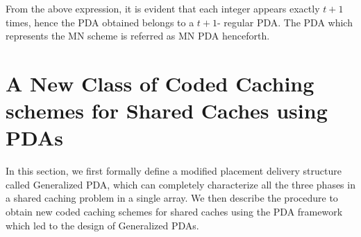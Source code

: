 \documentclass[conference,a4paper,10pt]{IEEEtran}
\begin{document}
From the above expression, it is evident that each integer appears exactly $t+1$ times, hence the PDA obtained belongs to a $t+1$- regular PDA. The PDA which represents the MN scheme is referred as MN PDA henceforth.

\section{A New Class of Coded Caching schemes for Shared Caches using PDAs }

In this section, we first formally define a modified placement delivery structure called Generalized PDA, which can completely characterize all the three phases in a shared caching problem in a single array. We then describe the procedure to obtain new coded caching schemes for shared caches using the PDA framework which led to the design of Generalized PDAs. 



\end{document}
